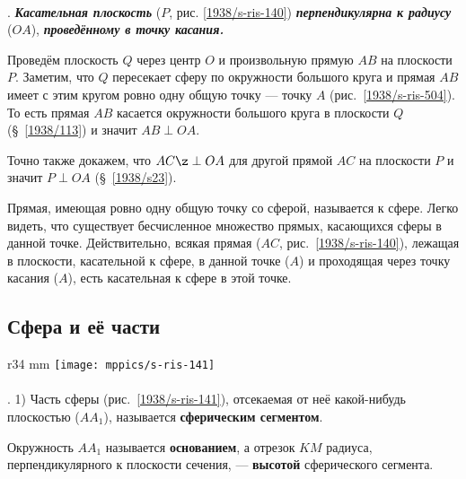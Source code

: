 \paragraph{}\label{1938/s133}
\mbox{.}
\textbf{\emph{Касательная плоскость}} ($P$, рис. \ref{1938/s-ris-140}) \textbf{\emph{перпендикулярна к радиусу}} ($OA$), \textbf{\emph{проведённому в точку касания.}}

Проведём плоскость $Q$ через центр $O$ и произвольную прямую $AB$ на плоскости~$P$.
Заметим, что $Q$ пересекает сферу по окружности большого круга и прямая $AB$ имеет с этим кругом ровно одну общую точку — точку $A$ (рис.~\ref{1938/s-ris-504}).
То есть прямая $AB$ касается окружности большого круга в плоскости $Q$ (§~\ref{1938/113}) и значит $AB\perp OA$.

Точно также докажем, что $AC\z\perp OA$ для другой прямой $AC$ на плоскости $P$
и значит $P\perp OA$ (§~\ref{1938/s23}).

Прямая, имеющая ровно одну общую точку со сферой, называется  к сфере.
Легко видеть, что существует бесчисленное множество прямых, касающихся сферы в данной точке.
Действительно, всякая прямая ($AC$, рис.~\ref{1938/s-ris-140}), лежащая в плоскости, касательной к сфере, в данной точке ($A$) и проходящая через точку касания ($A$), есть касательная к сфере в этой точке.

\subsection*{Сфера и её части} 

\begin{wrapfigure}{r}{34 mm}
\vskip-6mm
\centering
\texttt{[image: mppics/s-ris-141]}
\caption{}\label{1938/s-ris-141}
\vskip-0mm
\end{wrapfigure}

\paragraph{}\label{1938/s134}
\mbox{.}
1) Часть сферы (рис.~\ref{1938/s-ris-141}), отсекаемая от неё какой-нибудь плоскостью ($AA_1$), называется \textbf{сферическим сегментом}.

Окружность $AA_1$ называется \textbf{основанием}, а отрезок $KM$ радиуса, перпендикулярного к плоскости сечения, — \textbf{высотой} сферического сегмента.

